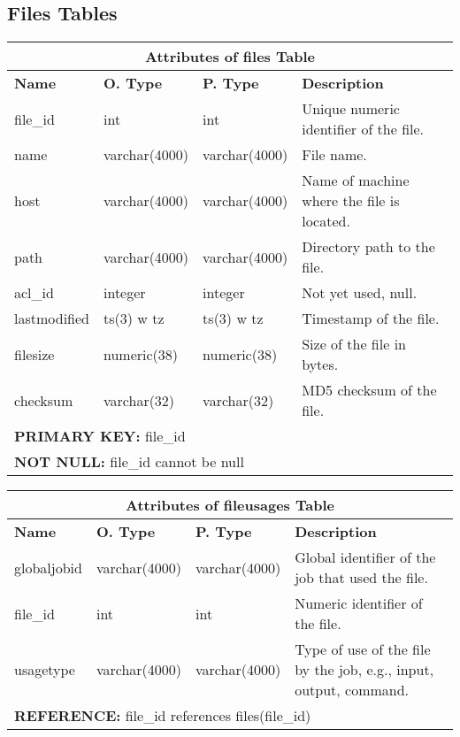 \subsection{Files Tables}
\begin{center}
  \begin{tabular}{|l|l|l|p{3.2in}|}\hline
    \multicolumn{4}{|c|}{\textbf{Attributes of files Table}}\\ \hline
    \textbf{Name} & \textbf{O. Type} & \textbf{P. Type} & \textbf{Description}\\ \hline
    file\_id & int & int & Unique numeric identifier of the file.\\ \hline
    name & varchar(4000) & varchar(4000) & File name.\\ \hline
    host & varchar(4000) & varchar(4000) & Name of machine where the file is located.\\ \hline
    path & varchar(4000) & varchar(4000) & Directory path to the file.\\ \hline
    acl\_id & integer & integer & Not yet used, null.\\ \hline
    lastmodified & ts(3) w tz & ts(3) w tz & Timestamp of the file.\\ \hline
    filesize & numeric(38) & numeric(38) & Size of the file in bytes.\\ \hline
    checksum & varchar(32) & varchar(32) & MD5 checksum of the file.\\ \hline
    \multicolumn{4}{|l|}{\textbf{PRIMARY KEY:} file\_id} \\ \hline
    \multicolumn{4}{|l|}{\textbf{NOT NULL:} file\_id cannot be null} \\ \hline
  \end{tabular}
\vspace{24pt}

  \begin{tabular}{|l|l|l|p{3.2in}|}\hline
    \multicolumn{4}{|c|}{\textbf{Attributes of fileusages Table}}\\ \hline
    \textbf{Name} & \textbf{O. Type} & \textbf{P. Type} & \textbf{Description}\\ \hline
    globaljobid & varchar(4000) & varchar(4000) & Global identifier of the job that used the file.\\ \hline
    file\_id & int & int & Numeric identifier of the file.\\ \hline
    usagetype & varchar(4000) & varchar(4000) & Type of use of the file by the job, e.g., input, output, command.\\ \hline
    \multicolumn{4}{|l|}{\textbf{REFERENCE:} file\_id references files(file\_id)} \\ \hline
  \end{tabular}
\vspace{24pt}


\end{center}
